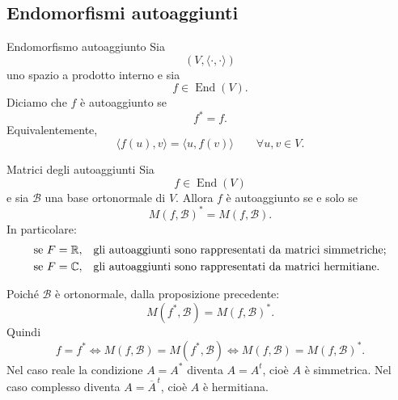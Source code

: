 \documentclass[a4paper]{article}
\begin{document}
\subsection{Endomorfismi autoaggiunti}

\begin{snippetdefinition}{Endomorfismo autoaggiunto}
    Sia
    \[
        (V,\langle\cdot,\cdot\rangle)
    \]
    uno spazio a prodotto interno e sia
    \[
        f\in\operatorname{End}(V).
    \]
    Diciamo che \(f\) è autoaggiunto se
    \[
        f^*=f.
    \]
    Equivalentemente,
    \[
        \langle f(u),v\rangle
        =
        \langle u,f(v)\rangle
        \qquad
        \forall u,v\in V.
    \]
\end{snippetdefinition}

\begin{snippetproposition}{Matrici degli autoaggiunti}
    Sia
    \[
        f\in\operatorname{End}(V)
    \]
    e sia \(\mathcal{B}\) una base ortonormale di \(V\). Allora \(f\) è autoaggiunto se e solo se
    \[
        M(f,\mathcal{B})^*=M(f,\mathcal{B}).
    \]
    In particolare:
    \[
        \begin{array}{ll}
            \text{se }F=\mathbb{R}, & \text{gli autoaggiunti sono rappresentati da matrici simmetriche;}\\[1mm]
            \text{se }F=\mathbb{C}, & \text{gli autoaggiunti sono rappresentati da matrici hermitiane.}
        \end{array}
    \]
\end{snippetproposition}

\begin{snippetproof}{}
    Poiché \(\mathcal{B}\) è ortonormale, dalla proposizione precedente:
    \[
        M(f^*,\mathcal{B})=M(f,\mathcal{B})^*.
    \]
    Quindi
    \[
        f=f^*
        \Longleftrightarrow
        M(f,\mathcal{B})=M(f^*,\mathcal{B})
        \Longleftrightarrow
        M(f,\mathcal{B})=M(f,\mathcal{B})^*.
    \]
    Nel caso reale la condizione \(A=A^*\) diventa \(A=A^t\), cioè \(A\) è simmetrica. Nel caso complesso diventa \(A=\overline{A}^{\,t}\), cioè \(A\) è hermitiana.
\end{snippetproof}
\end{document}
